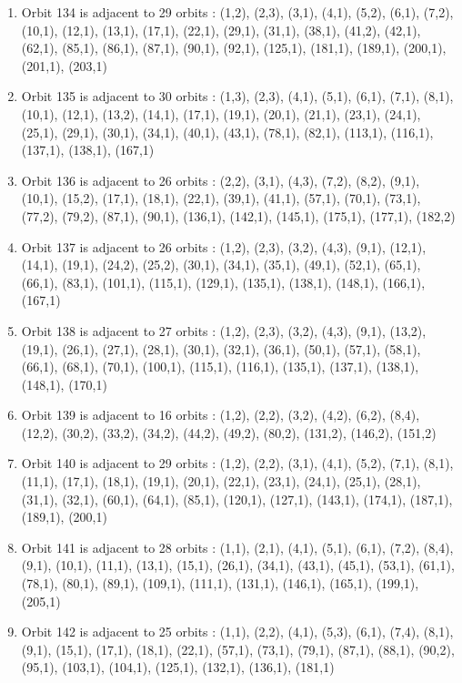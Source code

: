 \documentclass[12pt]{article}
\begin{document}
\begin{enumerate}
\item Orbit 134 is adjacent to 29 orbits : (1,2), (2,3), (3,1), (4,1), (5,2), (6,1), (7,2), (10,1), (12,1), (13,1), (17,1), (22,1), (29,1), (31,1), (38,1), (41,2), (42,1), (62,1), (85,1), (86,1), (87,1), (90,1), (92,1), (125,1), (181,1), (189,1), (200,1), (201,1), (203,1)
\item Orbit 135 is adjacent to 30 orbits : (1,3), (2,3), (4,1), (5,1), (6,1), (7,1), (8,1), (10,1), (12,1), (13,2), (14,1), (17,1), (19,1), (20,1), (21,1), (23,1), (24,1), (25,1), (29,1), (30,1), (34,1), (40,1), (43,1), (78,1), (82,1), (113,1), (116,1), (137,1), (138,1), (167,1)
\item Orbit 136 is adjacent to 26 orbits : (2,2), (3,1), (4,3), (7,2), (8,2), (9,1), (10,1), (15,2), (17,1), (18,1), (22,1), (39,1), (41,1), (57,1), (70,1), (73,1), (77,2), (79,2), (87,1), (90,1), (136,1), (142,1), (145,1), (175,1), (177,1), (182,2)
\item Orbit 137 is adjacent to 26 orbits : (1,2), (2,3), (3,2), (4,3), (9,1), (12,1), (14,1), (19,1), (24,2), (25,2), (30,1), (34,1), (35,1), (49,1), (52,1), (65,1), (66,1), (83,1), (101,1), (115,1), (129,1), (135,1), (138,1), (148,1), (166,1), (167,1)
\item Orbit 138 is adjacent to 27 orbits : (1,2), (2,3), (3,2), (4,3), (9,1), (13,2), (19,1), (26,1), (27,1), (28,1), (30,1), (32,1), (36,1), (50,1), (57,1), (58,1), (66,1), (68,1), (70,1), (100,1), (115,1), (116,1), (135,1), (137,1), (138,1), (148,1), (170,1)
\item Orbit 139 is adjacent to 16 orbits : (1,2), (2,2), (3,2), (4,2), (6,2), (8,4), (12,2), (30,2), (33,2), (34,2), (44,2), (49,2), (80,2), (131,2), (146,2), (151,2)
\item Orbit 140 is adjacent to 29 orbits : (1,2), (2,2), (3,1), (4,1), (5,2), (7,1), (8,1), (11,1), (17,1), (18,1), (19,1), (20,1), (22,1), (23,1), (24,1), (25,1), (28,1), (31,1), (32,1), (60,1), (64,1), (85,1), (120,1), (127,1), (143,1), (174,1), (187,1), (189,1), (200,1)
\item Orbit 141 is adjacent to 28 orbits : (1,1), (2,1), (4,1), (5,1), (6,1), (7,2), (8,4), (9,1), (10,1), (11,1), (13,1), (15,1), (26,1), (34,1), (43,1), (45,1), (53,1), (61,1), (78,1), (80,1), (89,1), (109,1), (111,1), (131,1), (146,1), (165,1), (199,1), (205,1)
\item Orbit 142 is adjacent to 25 orbits : (1,1), (2,2), (4,1), (5,3), (6,1), (7,4), (8,1), (9,1), (15,1), (17,1), (18,1), (22,1), (57,1), (73,1), (79,1), (87,1), (88,1), (90,2), (95,1), (103,1), (104,1), (125,1), (132,1), (136,1), (181,1)

\end{enumerate}
\end{document}
